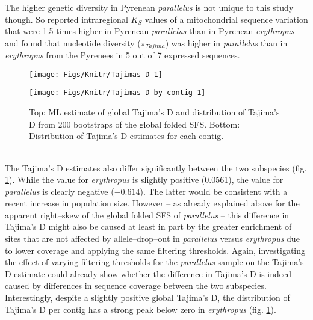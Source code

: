 \documentclass[a4paper,12pt,times,authoryear,twoside,print,index]{Classes/PhDThesisPSnPDF}\usepackage[]{graphicx}\usepackage[]{color}
\newenvironment{knitrout}{}{} %
\begin{document}
The higher genetic diversity in Pyrenean \textit{parallelus} is not unique to this study though. So reported \cite{Lunt1998} intraregional $K_{S}$ values of a mitochondrial sequence variation that were 1.5 times higher in Pyrenean \textit{parallelus} than in Pyrenean \textit{erythropus} and \cite[table 3--3]{Llewellyn2008} found that nucleotide diversity ($\pi_{Tajima}$) was higher in \textit{parallelus} than in \textit{erythropus} from the Pyrenees in 5 out of 7 expressed sequences.
%
\begin{figure}[htb]
\centering
\begin{knitrout}
\color{fgcolor}

{\centering \texttt{[image: Figs/Knitr/Tajimas-D-1]} 

}



\end{knitrout}
\begin{knitrout}
\color{fgcolor}

{\centering \texttt{[image: Figs/Knitr/Tajimas-D-by-contig-1]} 

}



\end{knitrout}
\caption{Top: ML estimate of global Tajima's D and distribution of Tajima's D from 200 bootstraps of the global folded \gls{SFS}. Bottom: Distribution of Tajima's D estimates for each contig.}
\label{Fig:Tajimas-D}
\end{figure}
%
\\
The Tajima's D estimates also differ significantly between the two subspecies (fig. \ref{Fig:Tajimas-D}). While the value for \textit{erythropus} is slightly positive (0.0561), the value for \textit{parallelus} is clearly negative (\ensuremath{-0.614}). The latter would be consistent with a recent increase in population size. However -- as already explained above for the apparent right--skew of the global folded \gls{SFS} of \textit{parallelus} -- this difference in Tajima's D might also be caused at least in part by the greater enrichment of sites that are not affected by allele--drop--out in \textit{parallelus} versus \textit{erythropus} due to lower coverage and applying the same filtering thresholds. Again, investigating the effect of varying filtering thresholds for the \textit{parallelus} sample on the Tajima's D estimate could already show whether the difference in Tajima's D is indeed caused by differences in sequence coverage between the two subspecies. Interestingly, despite a slightly positive global Tajima's D, the distribution of Tajima's D per contig has a strong peak below zero in \textit{erythropus} (fig. \ref{Fig:Tajimas-D}). 
\end{document}
